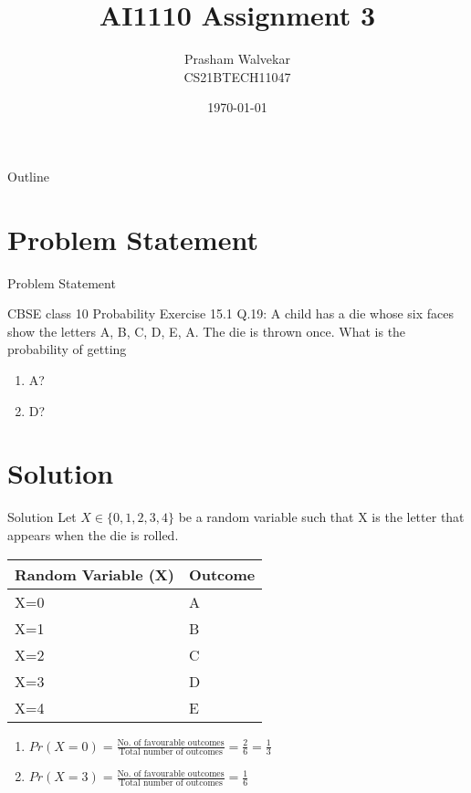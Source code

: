 \documentclass{beamer}
\title{AI1110 Assignment 3}
\author{Prasham Walvekar\\CS21BTECH11047}
\date{\today}
\begin{document}
\begin{frame}
    \titlepage 
\end{frame}

\logo{}


\begin{frame}{Outline}
    \tableofcontents
\end{frame}


\section{Problem Statement}
\begin{frame}{Problem Statement}

\begin{block}{CBSE class 10 Probability Exercise 15.1 Q.19:}
A child has a die whose six faces show the letters A, B, C, D, E, A. The die is thrown once. What is the probability of getting\\
\begin{enumerate}
    \item A?
    \item D?
\end{enumerate}

\end{block}

\end{frame}


\section{Solution}
\begin{frame}{Solution}
Let $X \in \{0, 1, 2, 3, 4\}$ be a random variable such that X is the letter that appears when the die is rolled.\\
\begin{table}[]
\begin{tabular}{|l|l|}
\hline
Random Variable (X) & Outcome \\ \hline
X=0                 & A       \\ \hline
X=1                 & B       \\ \hline
X=2                 & C       \\ \hline
X=3                 & D       \\ \hline
X=4                 & E       \\ \hline
\end{tabular}
\end{table}

\begin{enumerate}
    \item $Pr(X=0) = \frac{\text{No. of favourable outcomes}}{\text{Total number of outcomes}} = \frac{2}{6} = \frac{1}{3}$\\
    
    
    \item $Pr(X=3) = \frac{\text{No. of favourable outcomes}}{\text{Total number of outcomes}} = \frac{1}{6}$
\end{enumerate}
    
\end{frame} 
\end{document}
